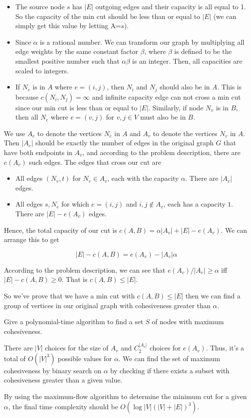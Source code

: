\begin{itemize}
\item The source node $s$ has $|E|$ outgoing edges and their capacity is all equal to 1. So the capacity of the min cut should be less than or equal to $|E|$ (we can simply get this value by letting A=$s$).
\item Since $\alpha$ is a rational number. We can transform our graph by multiplying all edge weights by the same constant factor $\beta$, where $\beta$ is defined to be the smallest positive number such that $\alpha \beta$ is an integer. Then, all capacities are scaled to integers.
\item If $N_e$ is in $A$ where $e=(i, j)$, then $N_i$ and $N_j$ should also be in $A$. This is because $c(N_i, N_j) = \infty$ and infinite capacity edge can not cross a min cut since our min cut is less than or equal to $|E|$. Similarly, if node $N_v$ is in $B$, then all $N_e$ where $e=(v, j)$ for $v ,j\in V$ must also be in $B$.
\end{itemize}

We use $A_e$ to denote the vertices $N_e$ in $A$ and $A_v$ to denote the vertices $N_v$ in $A$. Then $|A_e|$ should be exactly the number of edges in the original graph $G$ that have both endpoints in $A_v$, and according to the problem description, there are $e(A_v)$ such edges. The edges that cross our cut are 

\begin{itemize}
\item All edges $(N_v, t)$ for $N_v \in A_v$, each with the capacity $\alpha$. There are $|A_v|$ edges.
\item All edges $s, N_e$ for which $e=(i,j)$ and $i,j \notin A_v$, each has a capacity $1$. There are $|E|-e(A_v)$ edges.
\end{itemize}

Hence, the total capacity of our cut is $c(A,B)=\alpha |A_v|+|E|-e(A_v)$. We can arrange this to get

\[ |E|-c(A,B) = e(A_v) - |A_v|\alpha \]

According to the problem description, we can see that $e(A_v)/|A_v| \ge \alpha$ iff $|E|-c(A,B)\ge 0$. That is $c(A,B)\le |E|$.

So we've prove that we have a min cut with $c(A,B) \le |E|$ then we can find a group of vertices in our original graph with cohesiveness greater than $\alpha$.


Give a polynomial-time algorithm to find a set $S$ of nodes with maximum cohesiveness.


There are $|V|$ choices for the size of $A_v$ and $C_{2}^{|A_v|}$ choices for $e(A_v)$. Thus, it's a total of $O(|V|^3)$ possible values for $\alpha$. We can find the set of maximum cohesiveness by binary search on $\alpha$ by checking if there exists a subset with cohesiveness greater than a given value.


By using the maximum-flow algorithm to determine the minimum cut for a given $\alpha$, the final time complexity should be $O(\log|V| (|V|+|E|)^3)$.

